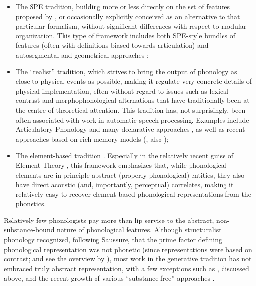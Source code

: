 \begin{itemize}
\item The SPE tradition, building more or less directly on the set of features proposed by \citet{spe}, or occasionally explicitly conceived as an alternative to that particular formalism, without significant differences with respect to modular organization. This type of framework includes both SPE\hyp style bundles of features (often with definitions biased towards articulation) and autosegmental and geometrical approaches \citep[\egm][]{sagey86,mccarthy88:_featur,clements91:_place,clements-hume1995,halle95:_featur_geomet_featur_spread};
\item The \enquote{realist} tradition, which strives to bring the output of phonology as close to physical events as possible, making it regulate very concrete details of physical implementation, often without regard to issues such as lexical contrast and morphophonological alternations that have traditionally been at the centre of theoretical attention. This tradition has, not surprisingly, been often associated with work in automatic speech processing. Examples include Articulatory Phonology \citep[\egm][]{browgold90,silverman03} and many declarative approaches \citep[\egm][]{ScobbieColemanBird,scobbie1997,coleman98:_phonol,Lodge2003931,lodge07:_timin_icelan,lodge09:_fundam_concep_in_phonol}, as well as recent approaches based on rich\hyp memory models (\citealp{pierrehumbert01:_exemp,pierrehumbert02:_word}, \cf also \citealp{pierrehumbert00:_concep,scobbie07:_inter,scobbie08:_quasi});
\item The element\hyp based tradition \citep[\egm][]{anderson87:_princ_depen_phonol}. Especially in the relatively recent guise of Element Theory \citep{harris94:_englis,harris05:_vowel_reduction,harris06,harris95,backley11:_elemen_theor}, this framework emphasizes that, while phonological elements are in principle abstract (\ie properly phonological) entities, they also have direct acoustic (and, importantly, perceptual) correlates, making it relatively easy to recover element\hyp based phonological representations from the phonetics.
\end{itemize}

Relatively few phonologists pay more than lip service to the abstract, non\hyp substance\hyp bound nature of phonological features. Although structuralist phonology recognized, following Saussure, that the prime factor defining phonological representation was not phonetic (since representations were based on contrast; \cf \citealp{Tru39,hjelmslev43:_omkrin,hjelmslev75:_resum} and see the overview by \citealp{dresher09}), most work in the generative tradition has not embraced truly abstract representation, with a few exceptions such as \citet{foley77:_found}, discussed above, and the recent growth of various \enquote{substance\hyp free} approaches \citep{hale00,hale-reiss2008,hale-kissock-reiss,moren-serbian,moren-foa,blaho-diss,youssef10:_laryn_buchan_scots,samuels11:_phonol}.

